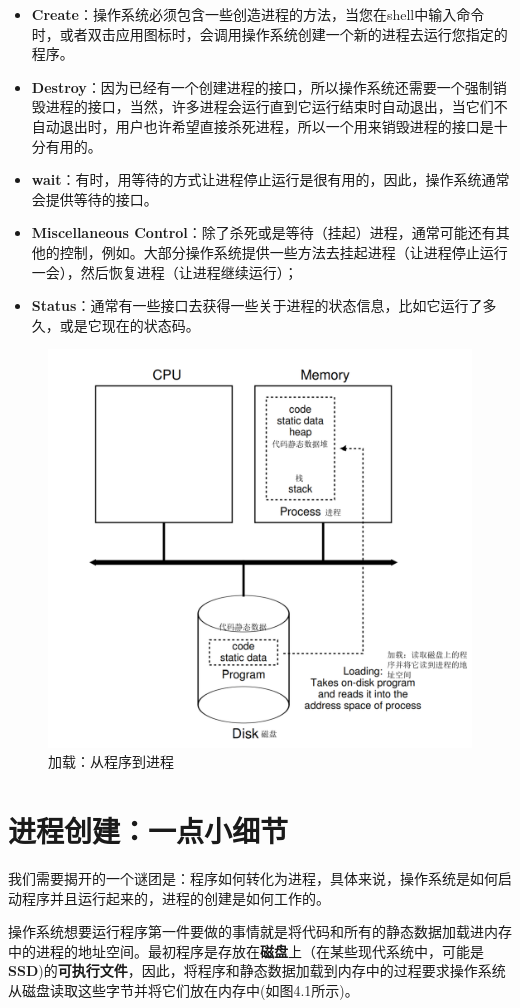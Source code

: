 \begin{itemize}
  \item \textbf{Create}：操作系统必须包含一些创造进程的方法，当您在shell中输入命令时，或者双击应用图标时，会调用操作系统创建一个新的进程去运行您指定的程序。
  \item \textbf{Destroy}：因为已经有一个创建进程的接口，所以操作系统还需要一个强制销毁进程的接口，当然，许多进程会运行直到它运行结束时自动退出，当它们不自动退出时，用户也许希望直接杀死进程，所以一个用来销毁进程的接口是十分有用的。
  \item \textbf{wait}：有时，用等待的方式让进程停止运行是很有用的，因此，操作系统通常会提供等待的接口。
  \item \textbf{Miscellaneous Control}：除了杀死或是等待（挂起）进程，通常可能还有其他的控制，例如。大部分操作系统提供一些方法去挂起进程（让进程停止运行一会），然后恢复进程（让进程继续运行）；
  \item \textbf{Status}：通常有一些接口去获得一些关于进程的状态信息，比如它运行了多久，或是它现在的状态码。
  \end{itemize}
  \begin{figure}[h]
  \centering
  \includegraphics[height=0.5\textwidth]{fig/figure-4-1.png}
  \caption{加载：从程序到进程} \label{fig:figure-4-1}
  \end{figure}   
\section{进程创建：一点小细节}
我们需要揭开的一个谜团是：程序如何转化为进程，具体来说，操作系统是如何启动程序并且运行起来的，进程的创建是如何工作的。

操作系统想要运行程序第一件要做的事情就是将代码和所有的静态数据加载进内存中的进程的地址空间。最初程序是存放在\textbf{磁盘}上（在某些现代系统中，可能是\textbf{SSD})的\textbf{可执行文件}，因此，将程序和静态数据加载到内存中的过程要求操作系统从磁盘读取这些字节并将它们放在内存中(如图4.1所示)。

